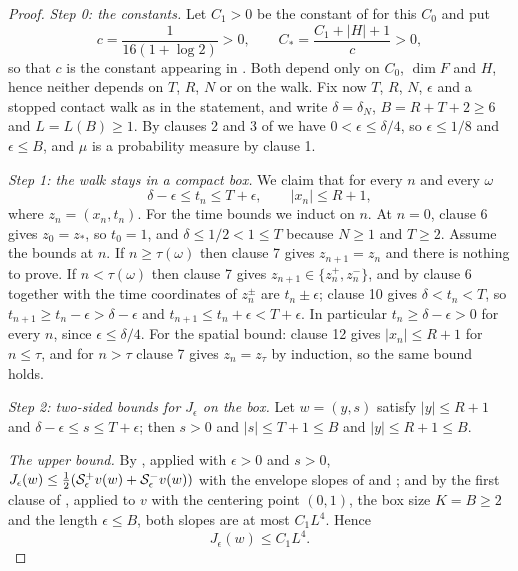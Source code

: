 \begin{proof}
\emph{Step 0: the constants.}
Let $C_1>0$ be the constant of  for this $C_0$
and put
\[
  c=\frac{1}{16(1+\log2)}>0,\qquad C_*=\frac{C_1+|H|+1}{c}>0 ,
\]
so that $c$ is the constant appearing in . Both depend only on
$C_0$, $\dim F$ and $H$, hence neither depends on $T$, $R$, $N$ or on the walk.
Fix now $T$, $R$, $N$, $\epsilon$ and a stopped contact walk as in the
statement, and write $\delta=\delta_N$, $B=R+T+2\ge6$ and $L=L(B)\ge1$. By
clauses 2 and 3 of  we have $0<\epsilon\le\delta/4$, so
$\epsilon\le1/8$ and $\epsilon\le B$, and $\mu$ is a probability measure by
clause 1.

\emph{Step 1: the walk stays in a compact box.}
We claim that for every $n$ and every $\omega$
\begin{equation}\label{eq:cwb-box}
  \delta-\epsilon\le t_n\le T+\epsilon,\qquad |x_n|\le R+1 ,
\end{equation}
where $z_n=(x_n,t_n)$. For the time bounds we induct on $n$. At $n=0$, clause 6
gives $z_0=z_*$, so $t_0=1$, and $\delta\le1/2<1\le T$ because $N\ge1$ and
$T\ge2$. Assume the bounds at $n$. If $n\ge\tau(\omega)$ then clause 7 gives
$z_{n+1}=z_n$ and there is nothing to prove. If $n<\tau(\omega)$ then clause 7
gives $z_{n+1}\in\{z^+_n,z^-_n\}$, and by clause 6 together with
 the time coordinates of $z^\pm_n$ are $t_n\pm\epsilon$;
clause 10 gives $\delta<t_n<T$, so $t_{n+1}\ge t_n-\epsilon>\delta-\epsilon$ and
$t_{n+1}\le t_n+\epsilon<T+\epsilon$. In particular $t_n\ge\delta-\epsilon>0$
for every $n$, since $\epsilon\le\delta/4$. For the spatial bound: clause 12
gives $|x_n|\le R+1$ for $n\le\tau$, and for $n>\tau$ clause 7 gives
$z_n=z_\tau$ by induction, so the same bound holds.

\emph{Step 2: two-sided bounds for $J_\epsilon$ on the box.}
Let $w=(y,s)$ satisfy $|y|\le R+1$ and $\delta-\epsilon\le s\le T+\epsilon$;
then $s>0$ and $|s|\le T+1\le B$ and $|y|\le R+1\le B$.

\emph{The upper bound.} By , applied with $\epsilon>0$ and
$s>0$, $J_\epsilon(w)\le\tfrac12(\mathcal{S}^+_\epsilon v(w)+\mathcal{S}^-_\epsilon v(w))$
with the envelope slopes of  and ; and by
the first clause of , applied to $v$ with the
centering point $(0,1)$, the box size $K=B\ge2$ and the length
$\epsilon\le B$, both slopes are at most $C_1L^4$. Hence
\begin{equation}\label{eq:cwb-Jup}
  J_\epsilon(w)\le C_1L^4 .
\end{equation}


\end{proof}
